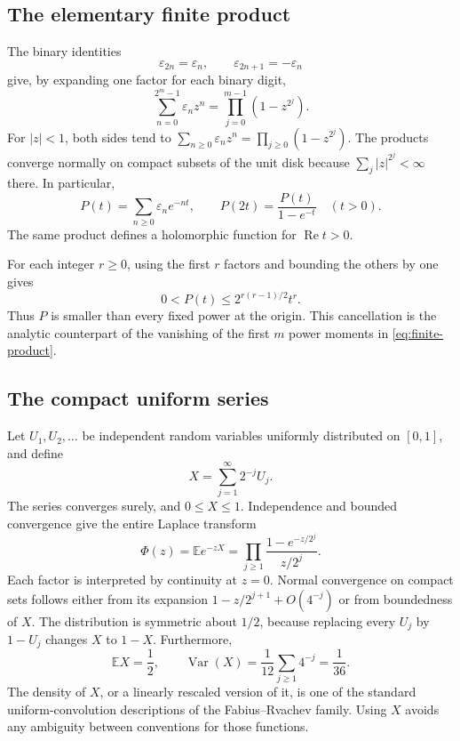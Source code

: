 \documentclass[11pt,a4paper]{article}
\numberwithin{equation}{section}
\theoremstyle{definition}
\theoremstyle{remark}
\newcommand{\eps}{\varepsilon}
\newcommand{\E}{\mathbb E}
\newcommand{\Rea}{\operatorname{Re}}
\newcommand{\abs}[1]{\left|#1\right|}
\begin{document}
\subsection{The elementary finite product}
The binary identities
\begin{equation}
 \eps_{2n}=\eps_n,\qquad \eps_{2n+1}=-\eps_n
 \label{eq:binary}
\end{equation}
give, by expanding one factor for each binary digit,
\begin{equation}
 \sum_{n=0}^{2^m-1}\eps_n z^n
 =\prod_{j=0}^{m-1}(1-z^{2^j}).
 \label{eq:finite-product}
\end{equation}
For $\abs z<1$, both sides tend to
$\sum_{n\ge0}\eps_nz^n=\prod_{j\ge0}(1-z^{2^j})$.
The products converge normally on compact subsets of the unit disk
because $\sum_j\abs z^{2^j}<\infty$ there. In particular,
\begin{equation}
 P(t)=\sum_{n\ge0}\eps_n e^{-nt},\qquad
 P(2t)=\frac{P(t)}{1-e^{-t}}
 \quad(t>0).
 \label{eq:P-mahler}
\end{equation}
The same product defines a holomorphic function for $\Rea t>0$.

For each integer $r\ge0$, using the first $r$ factors and bounding the
others by one gives
\begin{equation}
 0<P(t)\le 2^{r(r-1)/2}t^r.
 \label{eq:flat-bound}
\end{equation}
Thus $P$ is smaller than every fixed power at the origin. This
cancellation is the analytic counterpart of the vanishing of the
first $m$ power moments in \cref{eq:finite-product}.

\subsection{The compact uniform series}
Let $U_1,U_2,\ldots$ be independent random variables uniformly
distributed on $[0,1]$, and define
\begin{equation}
 X=\sum_{j=1}^\infty 2^{-j}U_j.
 \label{eq:X}
\end{equation}
The series converges surely, and $0\le X\le1$. Independence and
bounded convergence give the entire Laplace transform
\begin{equation}
 \Phi(z)=\E e^{-zX}
 =\prod_{j\ge1}\frac{1-e^{-z/2^j}}{z/2^j}.
 \label{eq:Phi-probability}
\end{equation}
Each factor is interpreted by continuity at $z=0$. Normal convergence
on compact sets follows either from its expansion $1-z/2^{j+1}+O(4^{-j})$
or from boundedness of $X$. The distribution is symmetric about
$1/2$, because replacing every $U_j$ by $1-U_j$ changes $X$ to $1-X$.
Furthermore,
\begin{equation}
 \E X=\frac12,\qquad
 \operatorname{Var}(X)=\frac1{12}\sum_{j\ge1}4^{-j}=\frac1{36}.
 \label{eq:X-moments}
\end{equation}
The density of $X$, or a linearly rescaled version of it, is one of
the standard uniform-convolution descriptions of the Fabius--Rvachev
family. Using $X$ avoids any ambiguity between conventions for those
functions.
\end{document}
